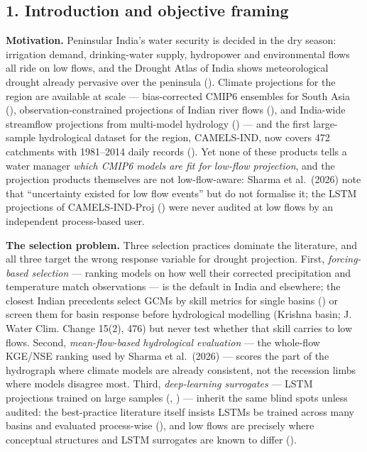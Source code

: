 \documentclass[
  english,
  11pt,
]{article}
\newcounter{none} %
\begin{document}
\subsection{1. Introduction and objective
framing}\label{introduction-and-objective-framing}

\textbf{Motivation.} Peninsular India's water security is decided in the
dry season: irrigation demand, drinking-water supply, hydropower and
environmental flows all ride on low flows, and the Drought Atlas of
India shows meteorological drought already pervasive over the peninsula
(). Climate
projections for the region are available at scale --- bias-corrected
CMIP6 ensembles for South Asia
(),
observation-constrained projections of Indian river flows
(), and
India-wide streamflow projections from multi-model hydrology
() --- and the first
large-sample hydrological dataset for the region, CAMELS-IND, now covers
472 catchments with 1981--2014 daily records
(). Yet
none of these products tells a water manager \emph{which CMIP6 models
are fit for low-flow projection}, and the projection products themselves
are not low-flow-aware: Sharma et al.~(2026) note that ``uncertainty
existed for low flow events'' but do not formalise it; the LSTM
projections of CAMELS-IND-Proj () were never audited at low flows by an independent
process-based user.

\textbf{The selection problem.} Three selection practices dominate the
literature, and all three target the wrong response variable for drought
projection. First, \emph{forcing-based selection} --- ranking models on
how well their corrected precipitation and temperature match
observations --- is the default in India and elsewhere; the closest
Indian precedents select GCMs by skill metrics for single basins
() or screen
them for basin response before hydrological modelling (Krishna basin; J.
Water Clim. Change 15(2), 476) but never test whether that skill carries
to low flows. Second, \emph{mean-flow-based hydrological evaluation} ---
the whole-flow KGE/NSE ranking used by Sharma et al.~(2026) --- scores
the part of the hydrograph where climate models are already consistent,
not the recession limbs where models disagree most. Third,
\emph{deep-learning surrogates} --- LSTM projections trained on large
samples (,
) --- inherit the same blind
spots unless audited: the best-practice literature itself insists LSTMs
be trained across many basins and evaluated process-wise
(), and low
flows are precisely where conceptual structures and LSTM surrogates are
known to differ ().
\end{document}
